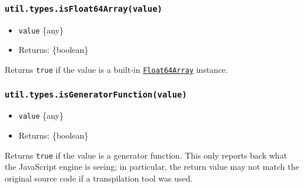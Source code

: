 \subsubsection{\texorpdfstring{\texttt{util.types.isFloat64Array(value)}}{util.types.isFloat64Array(value)}}\label{util.types.isfloat64arrayvalue}

\begin{itemize}
\tightlist
\item
  \texttt{value} \{any\}
\item
  Returns: \{boolean\}
\end{itemize}

Returns \texttt{true} if the value is a built-in
\href{https://developer.mozilla.org/en-US/docs/Web/JavaScript/Reference/Global_Objects/Float64Array}{\texttt{Float64Array}}
instance.

\begin{Shaded}
\begin{Highlighting}[]
\NormalTok{(} \NormalTok{())}\OperatorTok{;}  
\NormalTok{(} \NormalTok{())}\OperatorTok{;}  
\NormalTok{(} \NormalTok{())}\OperatorTok{;}  
\end{Highlighting}
\end{Shaded}

\subsubsection{\texorpdfstring{\texttt{util.types.isGeneratorFunction(value)}}{util.types.isGeneratorFunction(value)}}\label{util.types.isgeneratorfunctionvalue}

\begin{itemize}
\tightlist
\item
  \texttt{value} \{any\}
\item
  Returns: \{boolean\}
\end{itemize}

Returns \texttt{true} if the value is a generator function. This only
reports back what the JavaScript engine is seeing; in particular, the
return value may not match the original source code if a transpilation
tool was used.

